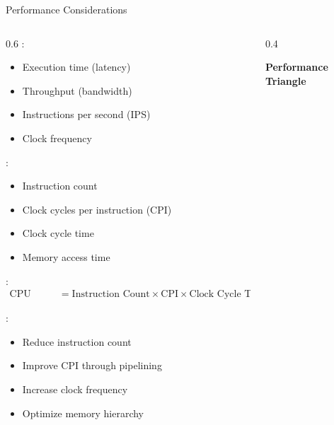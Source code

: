 \begin{frame}{Performance Considerations}
\begin{columns}
\begin{column}{0.6\textwidth}
:
\begin{itemize}
\item Execution time (latency)
\item Throughput (bandwidth)
\item Instructions per second (IPS)
\item Clock frequency
\end{itemize}

\vspace{0.3cm}
:
\begin{itemize}
\item Instruction count
\item Clock cycles per instruction (CPI)
\item Clock cycle time
\item Memory access time
\end{itemize}

\vspace{0.3cm}
:
\begin{align}
\text{CPU Time} &= \text{Instruction Count} \times \text{CPI} \times \text{Clock Cycle Time}
\end{align}

\vspace{0.3cm}
:
\begin{itemize}
\item Reduce instruction count
\item Improve CPI through pipelining
\item Increase clock frequency
\item Optimize memory hierarchy
\end{itemize}
\end{column}
\begin{column}{0.4\textwidth}
\begin{center}
\textbf{Performance Triangle}
\vspace{0.3cm}

\end{center}
\end{column}
\end{columns}
\end{frame}

